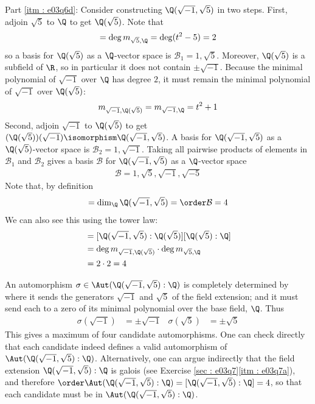 {Part \ref{itm : e03q6d}: Consider constructing $\Q(\sqrt{-1}, \sqrt{5})$ in two steps. First, adjoin $\sqrt{5}$ to $\Q$ to get $\Q(\sqrt{5})$. Note that
\begin{align*}
[\Q(\sqrt{5}) : \Q]
=
\deg m_{\sqrt{5}, \Q}
=
\deg(t^{2} - 5)
=
2
\end{align*}
so a basis for $\Q(\sqrt{5})$ as a $\Q$-vector space is $\mathcal{B}_{1} = 1, \sqrt{5}$. Moreover, $\Q(\sqrt{5})$ is a subfield of $\R$, so in particular it does not contain $\pm{}\sqrt{-1}$. Because the minimal polynomial of $\sqrt{-1}$ over $\Q$ has degree $2$, it must remain the minimal polynomial of $\sqrt{-1}$ over $\Q(\sqrt{5})$:
\begin{align*}
m_{\sqrt{-1}, \Q(\sqrt{5})}
=
m_{\sqrt{-1}, \Q}
=
t^{2} + 1
\end{align*}
Second, adjoin $\sqrt{-1}$ to $\Q(\sqrt{5})$ to get $(\Q(\sqrt{5}))(\sqrt{-1}) \isomorphism \Q(\sqrt{-1}, \sqrt{5})$. A basis for $\Q(\sqrt{-1}, \sqrt{5})$ as a $\Q(\sqrt{5})$-vector space is $\mathcal{B}_{2} = 1, \sqrt{-1}$. Taking all pairwise products of elements in $\mathcal{B}_{1}$ and $\mathcal{B}_{2}$ gives a basis $\mathcal{B}$ for $\Q(\sqrt{-1}, \sqrt{5})$ as a $\Q$-vector space
\begin{align*}
\mathcal{B}
=
1, \sqrt{5}, \sqrt{-1}, \sqrt{-5}
\end{align*}
Note that, by definition
\begin{align*}
[\Q(\sqrt{-1}, \sqrt{5}) : \Q]
=
\dim_{\Q} \Q(\sqrt{-1}, \sqrt{5})
=
\order \mathcal{B}
=
4
\end{align*}
We can also see this using the tower law:
\begin{align*}
[\Q(\sqrt{-1}, \sqrt{5}) : \Q]
&=
[\Q(\sqrt{-1}, \sqrt{5}) : \Q(\sqrt{5})] [\Q(\sqrt{5}) : \Q]
\\
&=
\deg m_{\sqrt{-1}, \Q(\sqrt{5})} \cdot \deg m_{\sqrt{5}, \Q}
\\
&=
2 \cdot 2
=
4
\end{align*}

An automorphism $\sigma \in \Aut(\Q(\sqrt{-1}, \sqrt{5}) : \Q)$ is completely determined by where it sends the generators $\sqrt{-1}$ and $\sqrt{5}$ of the field extension; and it must send each to a zero of its minimal polynomial over the base field, $\Q$. Thus
\begin{align*}
\sigma(\sqrt{-1})
&=
\pm{}\sqrt{-1}
&
\sigma(\sqrt{5})
&=
\pm{}\sqrt{5}
\end{align*}
This gives a maximum of four candidate automorphisms. One can check directly that each candidate indeed defines a valid automorphism of $\Aut(\Q(\sqrt{-1}, \sqrt{5}) : \Q)$. Alternatively, one can argue indirectly that the field extension $\Q(\sqrt{-1}, \sqrt{5}) : \Q$ is galois (see Exercise \ref{sec : e03q7}\ref{itm : e03q7a}), and therefore $\order \Aut(\Q(\sqrt{-1}, \sqrt{5}) : \Q) = [\Q(\sqrt{-1}, \sqrt{5}) : \Q] = 4$, so that each candidate must be in $\Aut(\Q(\sqrt{-1}, \sqrt{5}) : \Q)$.

}
